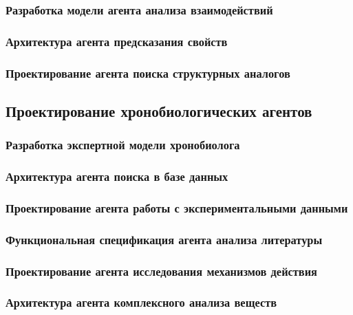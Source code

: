 \documentclass{syksu-coursework}
\begin{document}
\subsubsection{Разработка модели агента анализа взаимодействий}

\subsubsection{Архитектура агента предсказания свойств}

\subsubsection{Проектирование агента поиска структурных аналогов}

\subsection{Проектирование хронобиологических агентов}

\subsubsection{Разработка экспертной модели хронобиолога}

\subsubsection{Архитектура агента поиска в базе данных}

\subsubsection{Проектирование агента работы с экспериментальными данными}

\subsubsection{Функциональная спецификация агента анализа литературы}

\subsubsection{Проектирование агента исследования механизмов действия}

\subsubsection{Архитектура агента комплексного анализа веществ}
\end{document}
